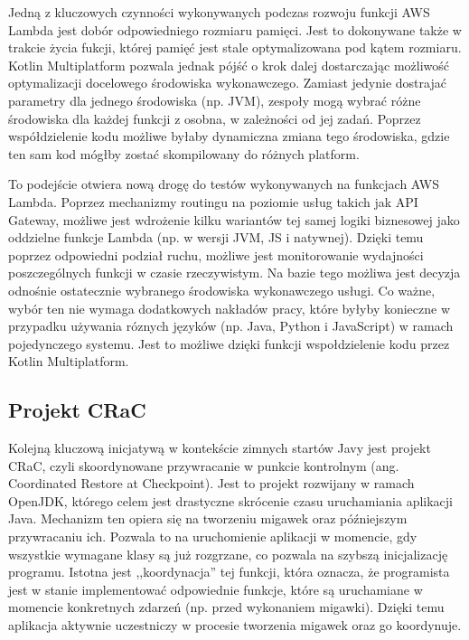 Jedną z kluczowych czynności wykonywanych podczas rozwoju funkcji AWS Lambda jest dobór odpowiedniego rozmiaru pamięci.
Jest to dokonywane także w trakcie życia fukcji, której pamięć jest stale optymalizowana pod kątem rozmiaru.
Kotlin Multiplatform pozwala jednak pójść o krok dalej dostarczając możliwość optymalizacji docelowego środowiska wykonawczego.
Zamiast jedynie dostrajać parametry dla jednego środowiska (np. JVM), zespoły mogą wybrać różne środowiska dla każdej funkcji z osobna, w zależności od jej zadań.
Poprzez współdzielenie kodu możliwe byłaby dynamiczna zmiana tego środowiska, gdzie ten sam kod mógłby zostać skompilowany do różnych platform.

To podejście otwiera nową drogę do testów wykonywanych na funkcjach AWS Lambda.
Poprzez mechanizmy routingu na poziomie usług takich jak API Gateway, możliwe jest wdrożenie kilku wariantów tej samej logiki biznesowej jako oddzielne funkcje Lambda (np. w wersji JVM, JS i natywnej).
Dzięki temu poprzez odpowiedni podział ruchu, możliwe jest monitorowanie wydajności poszczególnych funkcji w czasie rzeczywistym.
Na bazie tego możliwa jest decyzja odnośnie ostatecznie wybranego środowiska wykonawczego usługi.
Co ważne, wybór ten nie wymaga dodatkowych nakładów pracy, które byłyby konieczne w przypadku używania róznych języków (np. Java, Python i JavaScript) w ramach pojedynczego systemu.
Jest to możliwe dzięki funkcji wspołdzielenie kodu przez Kotlin Multiplatform.

\subsection*{Projekt CRaC}

Kolejną kluczową inicjatywą w kontekście zimnych startów Javy jest projekt CRaC, czyli skoordynowane przywracanie w punkcie kontrolnym (ang. Coordinated Restore at Checkpoint).
Jest to projekt rozwijany w ramach OpenJDK, którego celem jest drastyczne skrócenie czasu uruchamiania aplikacji Java.
Mechanizm ten opiera się na tworzeniu migawek oraz późniejszym przywracaniu ich.
Pozwala to na uruchomienie aplikacji w momencie, gdy wszystkie wymagane klasy są już rozgrzane, co pozwala na szybszą inicjalizację programu.
Istotna jest ,,koordynacja'' tej funkcji, która oznacza, że programista jest w stanie implementować odpowiednie funkcje, które są uruchamiane w momencie konkretnych zdarzeń (np. przed wykonaniem migawki).
Dzięki temu aplikacja aktywnie uczestniczy w procesie tworzenia migawek oraz go koordynuje.

